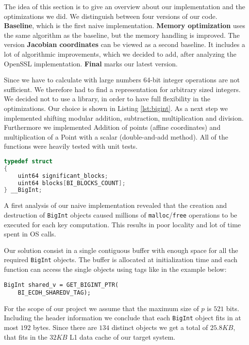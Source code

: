 The idea of this section is to give an overview about our implementation and the optimizations we did. We distinguish between four versions of our code. \textbf{Baseline}, which is the first naive implementation. \textbf{Memory optimization} uses the same algorithm as the baseline, but the memory handling is improved. The version \textbf{Jacobian coordinates} can be viewed as a second baseline. It includes a lot of algorithmic improvements, which we decided to add, after analyzing the OpenSSL implementation. \textbf{Final} marks our latest version.

Since we have to calculate with large numbers 64-bit integer operations are not sufficient. We therefore had to find a representation for arbitrary sized integers. We decided not to use a library, in order to have full flexibility in the optimizations. Our choice is shown in Listing \ref{lst:bigint}. As a next step we implemented shifting modular addition, subtraction, multiplication and division. Furthermore we implemented Addition of points (affine coordinates) and multiplication of a Point with a scalar (double-and-add method). All of the functions were heavily tested with unit tests.

\begin{lstlisting}[frame=single,  captionpos=b, caption=representation of the arbitrary size integers, label=lst:bigint, language=c]
typedef struct 
{
    uint64 significant_blocks;    
    uint64 blocks[BI_BLOCKS_COUNT]; 
} __BigInt;
\end{lstlisting}


A first analysis of our naive implementation revealed that the creation and destruction of \texttt{BigInt} objects caused millions of \texttt{malloc}/\texttt{free} operations to be executed for each key computation. This results in poor locality and lot of time spent in OS calls.

Our solution consist in a single contiguous buffer with enough space for all the required \texttt{BigInt} objects. The buffer is allocated at initialization time and each function can access the single objects using tags like in the example below:

\begin{lstlisting}[frame=single, mathescape=true, captionpos=b, caption=Access by tag example]
BigInt shared_v = GET_BIGINT_PTR(
    BI_ECDH_SHAREDV_TAG);
\end{lstlisting}

For the scope of our project we assume that the maximum size of $p$ is $521$ bits. Including the header information we conclude that each \texttt{BigInt} object fits in at most $192$ bytes. Since there are $134$ distinct objects we get a total of $25.8KB$, that fits in the $32KB$ L1 data cache of our target system.

